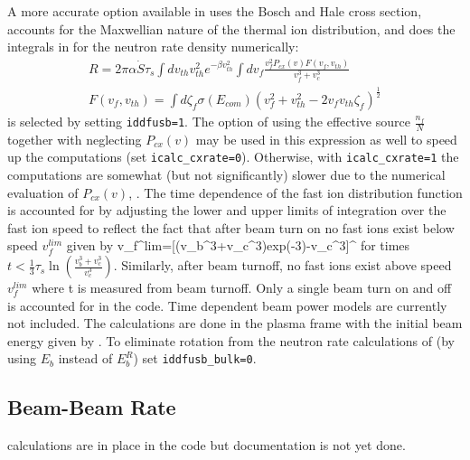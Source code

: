 A more accurate option available in \ot uses the Bosch and Hale\cite{Bosch}
cross section, accounts for the Maxwellian nature of the thermal ion
distribution, and does the integrals in   for the neutron rate
density numerically: 
\begin{eqnarray}
 R=2\pi\alpha\dot S \tau_s \int dv_{th}v_{th}^2e^{-\beta v_{th}^2}
 \int dv_f\frac{v_f^2P_{cx}(v)F(v_f,v_{th})}{v_f^3+v_c^3} \label{eq:12c}\\
 F(v_f,v_{th})=\int d\zeta_f\sigma(E_{com})(v_f^2+v_{th}^2
 -2v_fv_{th}\zeta_f)^{\frac{1}{2}} \nonumber
\end{eqnarray}
 is selected by setting \texttt{iddfusb=1}.  The option of using
the effective source $\frac{n_f}{N} $ together with  neglecting $P_{cx}(v) $ may
be used in this expression as well to speed up the computations (set
\texttt{icalc\_cxrate=0}). Otherwise, with \texttt{icalc\_cxrate=1} the
computations are somewhat (but not significantly)  slower due to the numerical
evaluation of $P_{cx}(v) $, . The time dependence of the fast ion
distribution function is accounted for by adjusting the lower and upper limits
of integration over the fast ion speed to reflect the fact that after beam turn
on no fast ions exist below speed $v_f^{lim}$ given by
\beq
 v_f^{lim}=[(v_b^3+v_c^3)exp(-3)-v_c^3]^{}
 \label{eq:13}
\eeq
for times $t<\frac{1}{3}\tau_s \ln\left(\frac{v_b^3+v_c^3}{v_c^3}\right)$.
Similarly, after beam turnoff, no fast ions exist above speed $v_f^{lim}$ where
t is  measured from beam turnoff. Only a single beam turn on and off is
accounted for in the code. Time dependent beam power models are currently not
included. The calculations are done in the plasma frame with the initial beam
energy given by . To eliminate rotation from the neutron rate
calculations of  (by using $E_b$ instead of $E_b^R $) set
\texttt{iddfusb\_bulk=0}.


\subsection{Beam-Beam Rate}
calculations are in place in the code but documentation is not yet done.
